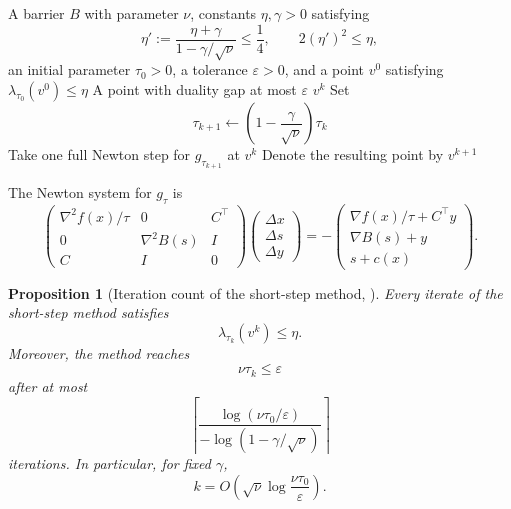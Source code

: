 \documentclass[a4paper,11pt]{book}
\theoremstyle{plain}
\newtheorem{proposition}[theorem]{Proposition}
\theoremstyle{definition}
\theoremstyle{remark}
\numberwithin{equation}{chapter}
\numberwithin{algorithm}{chapter}
\begin{document}
	\begin{algorithm}[H]
		\caption{Short-step path-following method}
		\begin{algorithmic}[1]
			\Require A barrier \(B\) with parameter \(\nu\), constants
			\(\eta,\gamma>0\) satisfying
			\[
			\eta'
			:=
			\frac{\eta+\gamma}{1-\gamma/\sqrt{\nu}}
			\leq\frac14,
			\qquad
			2(\eta')^2\leq\eta,
			\]
			an initial parameter \(\tau_0>0\), a tolerance \(\varepsilon>0\), and a
			point \(v^0\) satisfying \(\lambda_{\tau_0}(v^0)\leq\eta\)
			\Ensure A point with duality gap at most \(\varepsilon\)
			\State \Return \(v^k\)
			\EndIf
			\State Set
			\[
			\tau_{k+1}
			\gets
			\left(
			1-\frac{\gamma}{\sqrt{\nu}}
			\right)\tau_k
			\]
			\State Take one full Newton step for \(g_{\tau_{k+1}}\) at \(v^k\)
			\State Denote the resulting point by \(v^{k+1}\)
			\EndFor
		\end{algorithmic}
	\end{algorithm}
	
	The Newton system for \(g_\tau\) is
	\begin{equation}
		\begin{pmatrix}
			\nabla^2f(x)/\tau & 0                  & C^\top\\
			0                 & \nabla^2B(s)       & I\\
			C                 & I                  & 0
		\end{pmatrix}
		\begin{pmatrix}
			\Delta x\\
			\Delta s\\
			\Delta y
		\end{pmatrix}
		=
		-
		\begin{pmatrix}
			\nabla f(x)/\tau+C^\top y\\
			\nabla B(s)+y\\
			s+c(x)
		\end{pmatrix}.
		\label{eq:short-step-newton-system}
	\end{equation}
	
	\begin{proposition}[Iteration count of the short-step method,
		\cite{NesterovNemirovskii1994}]
		Every iterate of the short-step method satisfies
		\[
		\lambda_{\tau_k}(v^k)\leq\eta.
		\]
		Moreover, the method reaches
		\[
		\nu\tau_k\leq\varepsilon
		\]
		after at most
		\begin{equation}
			\left\lceil
			\frac{
				\log(\nu\tau_0/\varepsilon)
			}{
				-\log(1-\gamma/\sqrt{\nu})
			}
			\right\rceil
		\end{equation}
		iterations. In particular, for fixed \(\gamma\),
		\begin{equation}
			k
			=
			O\left(
			\sqrt{\nu}\log\frac{\nu\tau_0}{\varepsilon}
			\right).
		\end{equation}
	\end{proposition}
	
\end{document}
